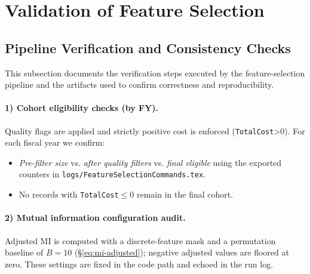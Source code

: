 \section{Validation of Feature Selection}



\subsection{Pipeline Verification and Consistency Checks}
\label{subsec:pipeline-verification}

This subsection documents the verification steps executed by the feature-selection pipeline and the artifacts used to confirm correctness and reproducibility.

\paragraph{1) Cohort eligibility checks (by FY).}
Quality flags are applied and strictly positive cost is enforced (\texttt{TotalCost}>0). For each fiscal year we confirm:
\begin{itemize}
  \item \emph{Pre-filter size} vs. \emph{after quality filters} vs. \emph{final eligible} using the exported counters in \texttt{logs/FeatureSelectionCommands.tex}.
  \item No records with \texttt{TotalCost}\(\le 0\) remain in the final cohort.
\end{itemize}

\paragraph{2) Mutual information configuration audit.}
Adjusted MI is computed with a discrete-feature mask and a permutation baseline of \(B{=}10\) (\S\ref{eq:mi-adjusted}); negative adjusted values are floored at zero. These settings are fixed in the code path and echoed in the run log.

